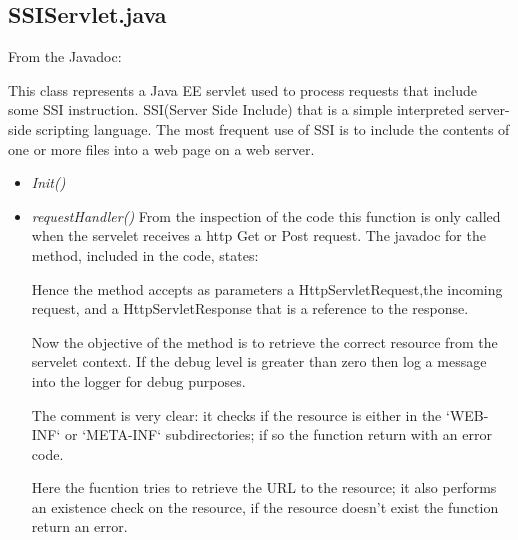 \documentclass[11pt,titlepage]{article} %
\begin{document}
\subsection{SSIServlet.java}

  From the Javadoc:
  
  

  \noindent This class represents a Java EE servlet used to process requests that include some SSI instruction.\newline
  SSI(Server Side Include) that is a simple interpreted server-side scripting language.
  The most frequent use of SSI is to include the contents of one or more files into a web page on a web server.

  \begin{itemize}
    \item \textit{Init()}
    \item \textit{requestHandler()}
      \newline From the inspection of the code this function is only called when the servelet receives a http Get or Post request.
      The javadoc for the method, included in the code, states:
      
      
      
      Hence the method accepts as parameters a HttpServletRequest,the incoming request, and a HttpServletResponse that is a reference
      to the response.\newline
      
      Now the objective of the method is to retrieve the correct resource from the servelet context.
      If the debug level is greater than zero then log a message into the logger for debug purposes.
      

      The comment is very clear: it checks if the resource is either in the `WEB-INF` or `META-INF` subdirectories;
      if so the function return with an error code.
      
      
      Here the fucntion tries to retrieve the URL to the resource; it also performs an existence check on the resource,
      if the resource doesn't exist the function return an error.
      
      

\end{itemize}
\end{document}
